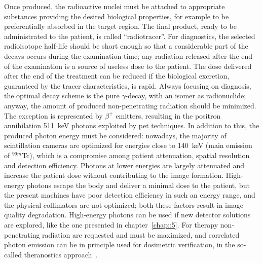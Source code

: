 Once produced, the radioactive nuclei must be attached  to appropriate substances providing the desired biological properties, for example to be preferentially absorbed in the target region. The final product, ready to be administrated to the patient, is called \enquote{radiotracer}. 
For diagnostics, the selected radioisotope half-life should be short enough so that a considerable part of the decays occurs during the examination time; any radiation released after the end of the examination is a source of useless dose to the patient. The dose delivered after the end of the treatment can be reduced if the biological excretion, guaranteed by the tracer characteristics, is rapid. Always focusing on diagnosis, the optimal decay scheme is the pure $\gamma$-decay, with an isomer as radionuclide; anyway, the amount of produced non-penetrating radiation should be minimized. The exception is represented by $\beta^+$ emitters, resulting in the positron annihilation 511~keV photons exploited by \gls{pet} techniques. In addition to this, the produced photon energy must be considered: nowadays, the majority of scintillation cameras are optimized for energies close to 140~keV (main emission of $^{99m}$Tc), which is a compromise among patient attenuation, spatial resolution and detection efficiency. Photons at lower energies are largely attenuated and increase the patient dose without contributing to the image formation. High-energy photons escape the body and deliver a minimal dose to the patient, but the present machines have poor detection efficiency in such an energy range, and the physical collimators are not optimized; both these factors result in image quality degradation. High-energy photons can be used if new detector solutions are explored, like the one presented in chapter~\ref{chap::5}. 
For therapy non-penetrating radiation are requested and must be maximized, and correlated photon emission can be in principle used for dosimetric verification, in the so-called theranostics approach~\parencite{Yordanova2017}. 
